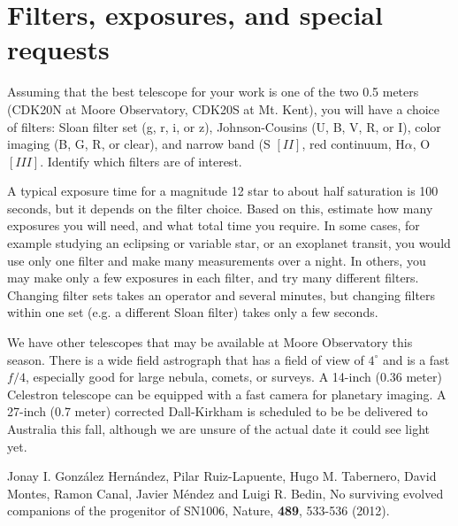 \documentclass[dvips,12pt]{article}
\begin{document}
\section{Filters, exposures, and special requests}

Assuming that the best telescope for your work is one of the two 0.5 meters
(CDK20N at Moore Observatory, CDK20S at Mt. Kent), you will have a choice of
filters:  Sloan filter set (g, r, i, or z),  Johnson-Cousins (U, B, V, R, or I),
color imaging (B, G, R, or clear), and narrow band (S $[II]$, red continuum,
H$\alpha$,  O$[III]$.  Identify which filters are of interest.

A typical exposure time for a magnitude 12 star to about half saturation is 100
seconds, but it depends on the filter choice.  Based on this, estimate how many
exposures you will need, and what total time you require.  In some cases, for
example studying an eclipsing or variable star, or an exoplanet transit, you
would use only one filter and make many measurements over a night.  In others,
you may make only a few exposures in each filter, and try many different
filters.   Changing filter sets takes an operator and several minutes, but
changing filters within one set (e.g. a different Sloan filter) takes only a few
seconds.

We have other telescopes that may be available at Moore Observatory this season.
There is a wide field astrograph that has a field of view of $4^\circ$ and is a
fast $f/4$,  especially good for large nebula, comets, or surveys.  A 14-inch
(0.36 meter) Celestron  telescope can be equipped with a fast camera for
planetary imaging.  A 27-inch (0.7 meter)  corrected Dall-Kirkham is scheduled
to be be delivered to Australia this fall, although we are unsure of the actual
date it could see light yet.



\begin{thebibliography}{99}

 Jonay I. Gonz\'{a}lez Hern\'{a}ndez,
Pilar Ruiz-Lapuente,
Hugo M. Tabernero,
David Montes,
Ramon Canal,
Javier M\'{e}ndez
and Luigi R. Bedin,
{No surviving evolved companions of the progenitor of SN1006},
Nature, {\bf 489}, 533-536 (2012).

\end{thebibliography}
\end{document}
